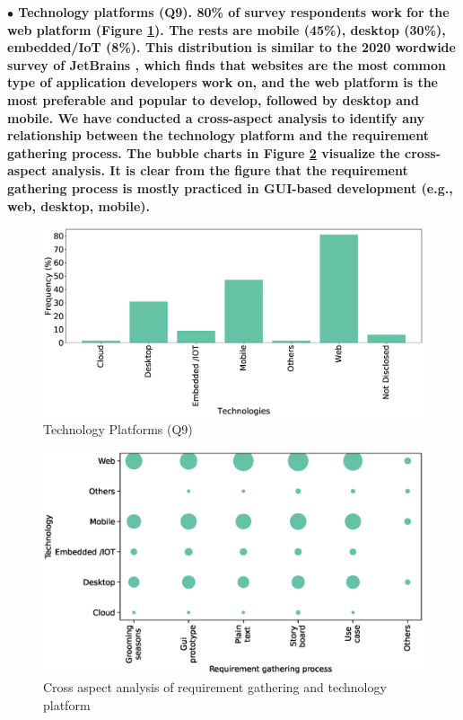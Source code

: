 \nd\bf{$\bullet$ Technology platforms (Q9).} 80\%  of survey respondents work for the web
platform (Figure \ref{fig:platforms}). The rests are mobile (45\%), desktop (30\%), embedded/IoT
(8\%). This distribution is similar to the 2020 wordwide survey of JetBrains \citep{JetBrains2020}, which finds that 
websites are the
most common type of application developers work on, and the web platform is the
most preferable and popular to develop, followed by desktop and mobile. We have conducted a cross-aspect analysis to identify any relationship
between the technology platform and the requirement gathering process. The
bubble charts in Figure \ref{fig:requirement technology cross analysis}
visualize the cross-aspect analysis. It is clear from the figure that the
requirement gathering process is mostly practiced in GUI-based development
(e.g., web, desktop, mobile).
\begin{figure}[t]
\centering
  \includegraphics[scale=0.18]{Figures/Respondents_Technologies}
  \caption{Technology Platforms (Q9)}
  \label{fig:platforms}
\end{figure}
\begin{figure}[t]
\centering
  \includegraphics[scale=0.47]{Figures/Requirement_Technology_Cross_Analysis.eps}
  \caption{Cross aspect analysis of requirement gathering and technology platform}
  \label{fig:requirement technology cross analysis}
\end{figure}

